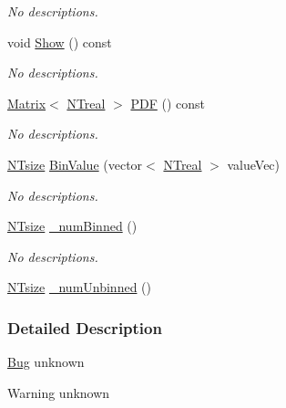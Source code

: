 \begin{DoxyCompactItemize}
\begin{DoxyCompactList}\small\item\em No descriptions. \item\end{DoxyCompactList}\item 
void \hyperlink{class_n_t__2dim__histogram__o_a4c821fa7bb66fc66eeb9d2db559e95b4}{Show} () const 
\begin{DoxyCompactList}\small\item\em No descriptions. \item\end{DoxyCompactList}\item 
\hyperlink{class_t_n_t_1_1_matrix}{Matrix}$<$ \hyperlink{nt__types_8h_a814a97893e9deb1eedcc7604529ba80d}{NTreal} $>$ \hyperlink{class_n_t__2dim__histogram__o_a84d6f23fc4fd52dd04d2353772073b3e}{PDF} () const 
\begin{DoxyCompactList}\small\item\em No descriptions. \item\end{DoxyCompactList}\item 
\hyperlink{nt__types_8h_a06c124f2e4469769b58230253ce0560b}{NTsize} \hyperlink{class_n_t__2dim__histogram__o_a8cbc724674a5356486c3842c04da445f}{BinValue} (vector$<$ \hyperlink{nt__types_8h_a814a97893e9deb1eedcc7604529ba80d}{NTreal} $>$ valueVec)
\begin{DoxyCompactList}\small\item\em No descriptions. \item\end{DoxyCompactList}\item 
\hyperlink{nt__types_8h_a06c124f2e4469769b58230253ce0560b}{NTsize} \hyperlink{class_n_t__2dim__histogram__o_aee597388aed9f5312c58a5145212c610}{\_\-numBinned} ()
\begin{DoxyCompactList}\small\item\em No descriptions. \item\end{DoxyCompactList}\item 
\hyperlink{nt__types_8h_a06c124f2e4469769b58230253ce0560b}{NTsize} \hyperlink{class_n_t__2dim__histogram__o_a19123903bb390571d773349914984c2c}{\_\-numUnbinned} ()
\end{DoxyCompactItemize}


\subsubsection{Detailed Description}
\begin{Desc}
\item[\hyperlink{bug__bug000093}{Bug}]unknown \end{Desc}
\begin{DoxyWarning}{Warning}
unknown 
\end{DoxyWarning}


